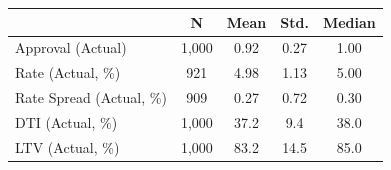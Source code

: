 {
\def\sym#1{\ifmmode^{#1}\else\(^{#1}\)\fi}
\begin{tabular}{l*{1}{cccc}}
\toprule
                    &           N&        Mean&        Std.&      Median\\
\midrule
Approval (Actual)   &       1,000&        0.92&        0.27&        1.00\\
Rate (Actual, \%)   &         921&        4.98&        1.13&        5.00\\
Rate Spread (Actual, \%)&         909&        0.27&        0.72&        0.30\\
DTI (Actual, \%)    &       1,000&        37.2&         9.4&        38.0\\
LTV (Actual, \%)    &       1,000&        83.2&        14.5&        85.0\\
\bottomrule
\end{tabular}
}
